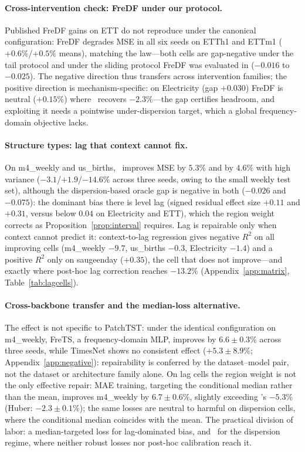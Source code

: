 \paragraph{Cross-intervention check: FreDF under our protocol.}
Published FreDF gains on ETT \citep{fredf} do not reproduce under the canonical configuration: FreDF degrades MSE in all six seeds on ETTh1 and ETTm1 ($+0.6\%$/$+0.5\%$ means), matching the law---both cells are gap-negative under the tail protocol and under the sliding protocol FreDF was evaluated in ($-0.016$ to $-0.025$). The negative direction thus transfers across intervention families; the positive direction is mechanism-specific: on Electricity (gap $+0.030$) FreDF is neutral ($+0.15\%$) where \rfc~recovers $-2.3\%$---the gap certifies headroom, and exploiting it needs a pointwise under-dispersion target, which a global frequency-domain objective lacks.

\paragraph{Structure types: lag that context cannot fix.}
On m4\_weekly and us\_births, \rfc~improves MSE by $5.3\%$ and by $4.6\%$ with high variance ($-3.1$/$+1.9$/$-14.6\%$ across three seeds, owing to the small weekly test set), although the dispersion-based oracle gap is negative in both ($-0.026$ and $-0.075$): the dominant bias there is level lag (signed residual effect size $+0.11$ and $+0.31$, versus below $0.04$ on Electricity and ETT), which the region weight corrects as Proposition~\ref{prop:interval} requires. Lag is repairable only when context cannot predict it: context-to-lag regression gives negative $R^2$ on all improving cells (m4\_weekly $-9.7$, us\_births $-0.3$, Electricity $-1.4$) and a positive $R^2$ only on saugeenday ($+0.35$), the cell that does not improve---and exactly where post-hoc lag correction reaches $-13.2\%$ (Appendix~\ref{app:matrix}, Table~\ref{tab:lagcells}).

\paragraph{Cross-backbone transfer and the median-loss alternative.}
The effect is not specific to PatchTST: under the identical configuration on m4\_weekly, FreTS, a frequency-domain MLP, improves by $6.6 \pm 0.3\%$ across three seeds, while TimesNet shows no consistent effect ($+5.3 \pm 8.9\%$; Appendix~\ref{app:negative}): repairability is conferred by the dataset--model pair, not the dataset or architecture family alone. On lag cells the region weight is not the only effective repair: MAE training, targeting the conditional median rather than the mean, improves m4\_weekly by $6.7 \pm 0.6\%$, slightly exceeding \rfc's $-5.3\%$ (Huber: $-2.3 \pm 0.1\%$); the same losses are neutral to harmful on dispersion cells, where the conditional median coincides with the mean. The practical division of labor: a median-targeted loss for lag-dominated bias, and \rfc~for the dispersion regime, where neither robust losses nor post-hoc calibration reach it.

